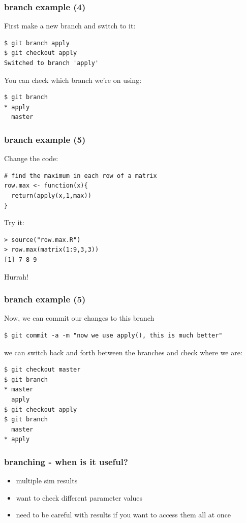 \documentclass[ignorenonframetext,]{beamer}
\begin{document}
\begin{frame}[fragile]\frametitle{branch example (4)}

First make a new branch and switch to it:

\begin{verbatim}
$ git branch apply
$ git checkout apply
Switched to branch 'apply'
\end{verbatim}

You can check which branch we're on using:

\begin{verbatim}
$ git branch
* apply
  master
\end{verbatim}

\end{frame}

\begin{frame}[fragile]\frametitle{branch example (5)}

Change the code:

\begin{verbatim}
# find the maximum in each row of a matrix
row.max <- function(x){
  return(apply(x,1,max))
}
\end{verbatim}

Try it:

\begin{verbatim}
> source("row.max.R")
> row.max(matrix(1:9,3,3))
[1] 7 8 9
\end{verbatim}

Hurrah!

\end{frame}

\begin{frame}[fragile]\frametitle{branch example (5)}

Now, we can commit our changes to this branch

\begin{verbatim}
$ git commit -a -m "now we use apply(), this is much better"
\end{verbatim}

we can switch back and forth between the branches and check where we
are:

\begin{verbatim}
$ git checkout master
$ git branch
* master
  apply
$ git checkout apply
$ git branch
  master
* apply
\end{verbatim}

\end{frame}

\begin{frame}\frametitle{branching - when is it useful?}

\begin{itemize}[<+->]
\item
  multiple sim results
\item
  want to check different parameter values
\item
  need to be careful with results if you want to access them all at once
\end{itemize}

\end{frame}
\end{document}
